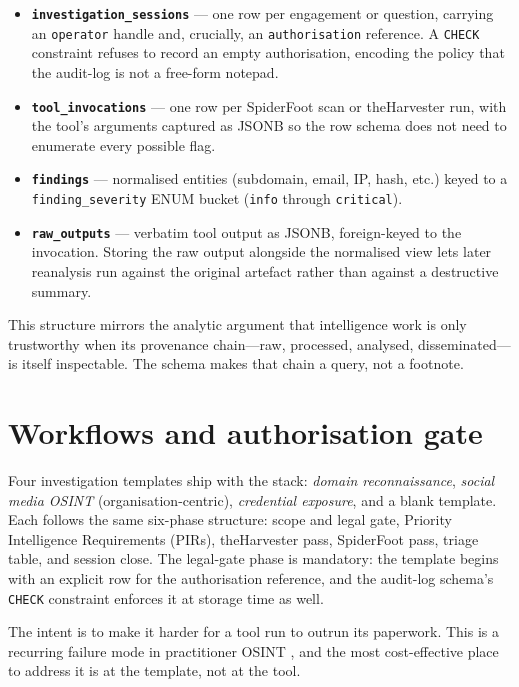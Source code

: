 \documentclass[conference,a4paper,10pt]{IEEEtran}
\begin{document}
\begin{itemize}
  \item \textbf{\texttt{investigation\_sessions}} --- one row per
    engagement or question, carrying an \texttt{operator} handle and,
    crucially, an \texttt{authorisation} reference. A \texttt{CHECK}
    constraint refuses to record an empty authorisation, encoding
    the policy that the audit-log is not a free-form notepad.
  \item \textbf{\texttt{tool\_invocations}} --- one row per
    SpiderFoot scan or theHarvester run, with the tool's arguments
    captured as JSONB so the row schema does not need to enumerate
    every possible flag.
  \item \textbf{\texttt{findings}} --- normalised entities (subdomain,
    email, IP, hash, etc.) keyed to a \texttt{finding\_severity}
    ENUM bucket (\texttt{info} through \texttt{critical}).
  \item \textbf{\texttt{raw\_outputs}} --- verbatim tool output as
    JSONB, foreign-keyed to the invocation. Storing the raw output
    alongside the normalised view lets later reanalysis run against
    the original artefact rather than against a destructive
    summary.
\end{itemize}

This structure mirrors the analytic argument
\cite{heuer1999} that intelligence work is only trustworthy when its
provenance chain---raw, processed, analysed, disseminated---is itself
inspectable. The schema makes that chain a query, not a footnote.

\section{Workflows and authorisation gate}

Four investigation templates ship with the stack: \emph{domain
reconnaissance}, \emph{social media OSINT} (organisation-centric),
\emph{credential exposure}, and a blank template. Each follows the
same six-phase structure: scope and legal gate, Priority Intelligence
Requirements (PIRs), theHarvester pass, SpiderFoot pass, triage
table, and session close. The legal-gate phase is mandatory: the
template begins with an explicit row for the authorisation reference,
and the audit-log schema's \texttt{CHECK} constraint enforces it at
storage time as well.

The intent is to make it harder for a tool run to outrun its
paperwork. This is a recurring failure mode in practitioner OSINT
\cite{bazzell2023}, and the most cost-effective place to address it
is at the template, not at the tool.
\end{document}
